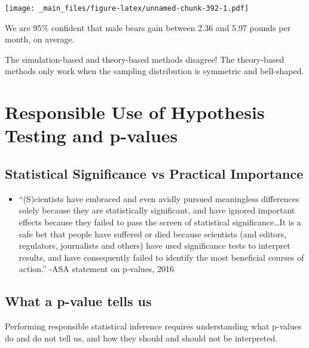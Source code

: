 \documentclass[]{book}
\providecommand{\tightlist}{%
  \setlength{\itemsep}{0pt}\setlength{\parskip}{0pt}}
\begin{document}
\texttt{[image: \_main\_files/figure-latex/unnamed-chunk-392-1.pdf]}

We are 95\% confident that male bears gain between 2.36 and 5.97 pounds
per month, on average.

The simulation-based and theory-based methods disagree! The theory-based
methods only work when the sampling distribution is symmetric and
bell-shaped.

\section{Responsible Use of Hypothesis Testing and
p-values}\label{responsible-use-of-hypothesis-testing-and-p-values}

\subsection{Statistical Significance vs Practical
Importance}\label{statistical-significance-vs-practical-importance}

\begin{itemize}
\tightlist
\item
  ``(S)cientists have embraced and even avidly pursued meaningless
  differences solely because they are statistically significant, and
  have ignored important effects because they failed to pass the screen
  of statistical significance\ldots{}It is a safe bet that people have
  suffered or died because scientists (and editors, regulators,
  journalists and others) have used significance tests to interpret
  results, and have consequently failed to identify the most beneficial
  courses of action.'' -ASA statement on p-values, 2016
\end{itemize}

\subsection{What a p-value tells us}\label{what-a-p-value-tells-us}

Performing responsible statistical inference requires understanding what
p-values do and do not tell us, and how they should and should not be
interpreted.
\end{document}
